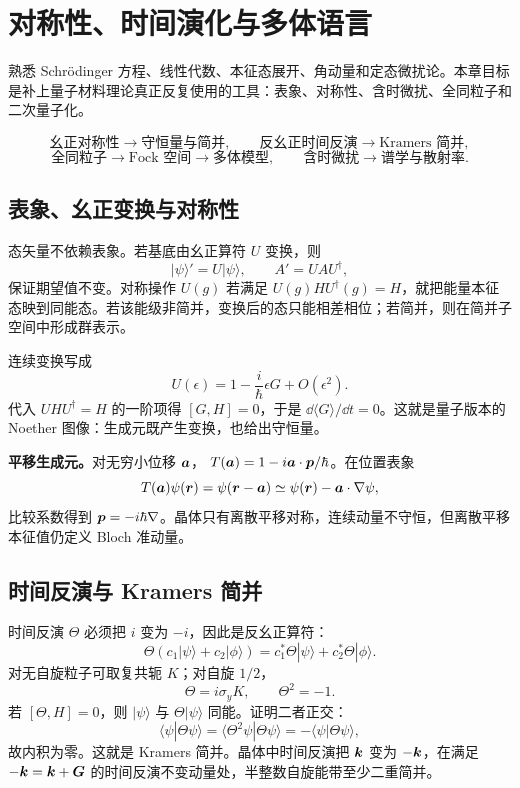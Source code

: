 \chapter{对称性、时间演化与多体语言}

\begin{prereqbox}
熟悉 Schrödinger 方程、线性代数、本征态展开、角动量和定态微扰论。本章目标是补上量子材料理论真正反复使用的工具：表象、对称性、含时微扰、全同粒子和二次量子化。
\end{prereqbox}
\begin{mapbox}
\[
\text{幺正对称性}\to\text{守恒量与简并},\qquad
\text{反幺正时间反演}\to\text{Kramers 简并},
\]
\[
\text{全同粒子}\to\text{Fock 空间}\to
\text{多体模型},\qquad
\text{含时微扰}\to\text{谱学与散射率}.
\]
\end{mapbox}

\section{表象、幺正变换与对称性}
态矢量不依赖表象。若基底由幺正算符 $U$ 变换，则
\[
|\psi\rangle'=U|\psi\rangle,\qquad A'=UAU^\dagger,
\]
保证期望值不变。对称操作 $U(g)$ 若满足
$U(g)HU^\dagger(g)=H$，就把能量本征态映到同能态。若该能级非简并，变换后的态只能相差相位；若简并，则在简并子空间中形成群表示。

连续变换写成
\[
U(\epsilon)=1-\frac{i}{\hbar}\epsilon G+O(\epsilon^2).
\]
代入 $UHU^\dagger=H$ 的一阶项得 $[G,H]=0$，于是
$\dd\langle G\rangle/\dd t=0$。这就是量子版本的 Noether 图像：生成元既产生变换，也给出守恒量。

\begin{examplebox}
\textbf{平移生成元。}对无穷小位移 $\bm{a}$，
$T(\bm{a})=1-i\bm{a}\cdot\bm{p}/\hbar$。在位置表象
\[
T(\bm{a})\psi(\bm{r})=\psi(\bm{r}-\bm{a})
\simeq\psi(\bm{r})-\bm{a}\cdot\nabla\psi,
\]
比较系数得到 $\bm{p}=-i\hbar\nabla$。晶体只有离散平移对称，连续动量不守恒，但离散平移本征值仍定义 Bloch 准动量。
\end{examplebox}

\section{时间反演与 Kramers 简并}
时间反演 $\Theta$ 必须把 $i$ 变为 $-i$，因此是反幺正算符：
\[
\Theta(c_1|\psi\rangle+c_2|\phi\rangle)
=c_1^*\Theta|\psi\rangle+c_2^*\Theta|\phi\rangle.
\]
对无自旋粒子可取复共轭 $K$；对自旋 $1/2$，
\[
\Theta=i\sigma_yK,\qquad \Theta^2=-1.
\]
若 $[\Theta,H]=0$，则 $|\psi\rangle$ 与 $\Theta|\psi\rangle$ 同能。证明二者正交：
\[
\langle\psi|\Theta\psi\rangle
=\langle\Theta^2\psi|\Theta\psi\rangle
=-\langle\psi|\Theta\psi\rangle,
\]
故内积为零。这就是 Kramers 简并。晶体中时间反演把 $\bm{k}$ 变为 $-\bm{k}$，在满足
$-\bm{k}=\bm{k}+\bm{G}$ 的时间反演不变动量处，半整数自旋能带至少二重简并。

